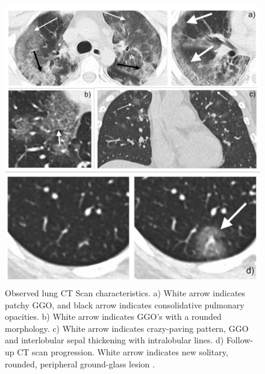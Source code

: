 \begin{figure}[H]
 \centering
 \includegraphics[width=15.5cm, height=12.5cm]{Images/CTScans2.jpg}
 \caption[CT Scan Images]{Observed lung CT Scan characteristics. a) White arrow indicates patchy GGO, and black arrow indicates consolidative pulmonary opacities. b) White arrow indicates GGO's with a rounded morphology. c)  White arrow indicates crazy-paving pattern, GGO and interlobular sepal thickening with intralobular lines. d) Follow-up CT scan progression. White arrow indicates new solitary, rounded, peripheral ground-glass lesion \cite{CMA+2020}.}
 \label{fig:CT Scan Image 1}
 \end{figure}

        
